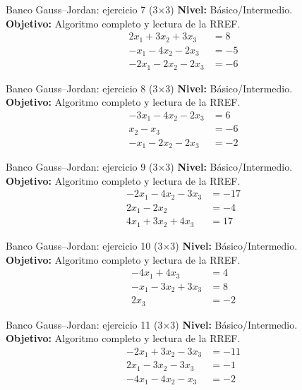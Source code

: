 \documentclass[aspectratio=169,9pt]{beamer}
\theoremstyle{remark}
\begin{document}
\begin{frame}[t]{Banco Gauss--Jordan: ejercicio 7 (3$\times$3)}
\textbf{Nivel:} Básico/Intermedio.\\
\textbf{Objetivo:} Algoritmo completo y lectura de la RREF.
\[
\begin{aligned}
2 x_{1} + 3 x_{2} + 3 x_{3} &= 8\\
- x_{1} - 4 x_{2} - 2 x_{3} &= -5\\
- 2 x_{1} - 2 x_{2} - 2 x_{3} &= -6
\end{aligned}
\]
\end{frame}
\begin{frame}[t]{Banco Gauss--Jordan: ejercicio 8 (3$\times$3)}
\textbf{Nivel:} Básico/Intermedio.\\
\textbf{Objetivo:} Algoritmo completo y lectura de la RREF.
\[
\begin{aligned}
- 3 x_{1} - 4 x_{2} - 2 x_{3} &= 6\\
x_{2} - x_{3} &= -6\\
- x_{1} - 2 x_{2} - 2 x_{3} &= -2
\end{aligned}
\]
\end{frame}
\begin{frame}[t]{Banco Gauss--Jordan: ejercicio 9 (3$\times$3)}
\textbf{Nivel:} Básico/Intermedio.\\
\textbf{Objetivo:} Algoritmo completo y lectura de la RREF.
\[
\begin{aligned}
- 2 x_{1} - 4 x_{2} - 3 x_{3} &= -17\\
2 x_{1} - 2 x_{2} &= -4\\
4 x_{1} + 3 x_{2} + 4 x_{3} &= 17
\end{aligned}
\]
\end{frame}
\begin{frame}[t]{Banco Gauss--Jordan: ejercicio 10 (3$\times$3)}
\textbf{Nivel:} Básico/Intermedio.\\
\textbf{Objetivo:} Algoritmo completo y lectura de la RREF.
\[
\begin{aligned}
- 4 x_{1} + 4 x_{3} &= 4\\
- x_{1} - 3 x_{2} + 3 x_{3} &= 8\\
2 x_{3} &= -2
\end{aligned}
\]
\end{frame}
\begin{frame}[t]{Banco Gauss--Jordan: ejercicio 11 (3$\times$3)}
\textbf{Nivel:} Básico/Intermedio.\\
\textbf{Objetivo:} Algoritmo completo y lectura de la RREF.
\[
\begin{aligned}
- 2 x_{1} + 3 x_{2} - 3 x_{3} &= -11\\
2 x_{1} - 3 x_{2} - 3 x_{3} &= -1\\
- 4 x_{1} - 4 x_{2} - x_{3} &= -2
\end{aligned}
\]
\end{frame}
\end{document}
